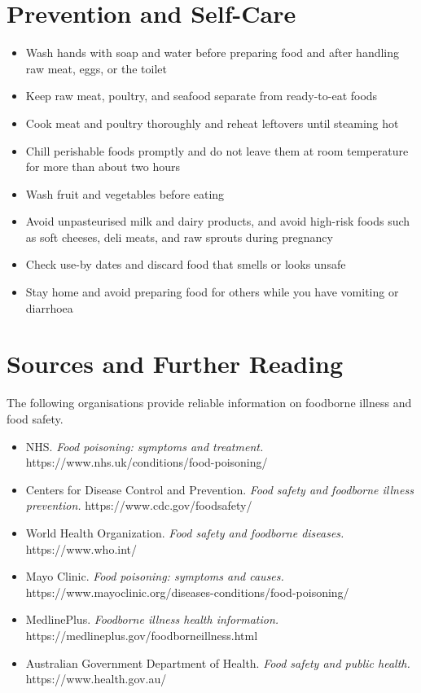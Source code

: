 \section*{Prevention and Self-Care}
\begin{itemize}
    \item Wash hands with soap and water before preparing food and after handling raw meat, eggs, or the toilet
    \item Keep raw meat, poultry, and seafood separate from ready-to-eat foods
    \item Cook meat and poultry thoroughly and reheat leftovers until steaming hot
    \item Chill perishable foods promptly and do not leave them at room temperature for more than about two hours
    \item Wash fruit and vegetables before eating
    \item Avoid unpasteurised milk and dairy products, and avoid high-risk foods such as soft cheeses, deli meats, and raw sprouts during pregnancy
    \item Check use-by dates and discard food that smells or looks unsafe
    \item Stay home and avoid preparing food for others while you have vomiting or diarrhoea
\end{itemize}

\section*{Sources and Further Reading}
The following organisations provide reliable information on foodborne illness and food safety.

\begin{itemize}
    \item NHS. \textit{Food poisoning: symptoms and treatment.} https://www.nhs.uk/conditions/food-poisoning/
    \item Centers for Disease Control and Prevention. \textit{Food safety and foodborne illness prevention.} https://www.cdc.gov/foodsafety/
    \item World Health Organization. \textit{Food safety and foodborne diseases.} https://www.who.int/
    \item Mayo Clinic. \textit{Food poisoning: symptoms and causes.} https://www.mayoclinic.org/diseases-conditions/food-poisoning/
    \item MedlinePlus. \textit{Foodborne illness health information.} https://medlineplus.gov/foodborneillness.html
    \item Australian Government Department of Health. \textit{Food safety and public health.} https://www.health.gov.au/
\end{itemize}
